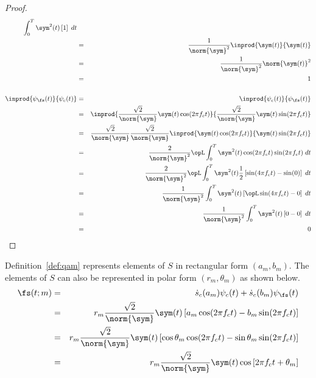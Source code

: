 \begin{proof}
\begin{eqnarray*}
          \int_0^T \sym^2(t)\left[ 1 \right] \; dt
    \\&=& \frac{1}{\norm{\sym}^2}
          \inprod{\sym(t)}{\sym(t)}
    \\&=& \frac{1}{\norm{\sym}^2}
          \norm{\sym(t)}^2
    \\&=& 1
\\ \\
   \inprod{\psi_\fs(t)}{\psi_c(t)}
      &=& \inprod{\psi_c(t)}{\psi_\fs(t)}
    \\&=& \inprod{\frac{\sqrt{2}}{\norm{\sym}} \sym(t) \cos(2\pi f_c t)}
                 {\frac{\sqrt{2}}{\norm{\sym}} \sym(t) \sin(2\pi f_c t)}
    \\&=& \frac{\sqrt{2}}{\norm{\sym}}\frac{\sqrt{2}}{\norm{\sym}}
          \inprod{ \sym(t) \cos(2\pi f_c t)}
                 { \sym(t) \sin(2\pi f_c t)}
    \\&=& \frac{2}{\norm{\sym}^2}
          \opL
          \int_0^T \sym^2(t) \cos(2\pi f_c t)\sin(2\pi f_c t) \; dt
    \\&=& \frac{2}{\norm{\sym}^2}
          \opL
          \int_0^T \sym^2(t)\frac{1}{2}
          \left[\sin(4\pi f_c t)-\sin(0)\right] \; dt
    \\&=& \frac{1}{\norm{\sym}^2}
          \int_0^T \sym^2(t)
          \left[\opL\sin(4\pi f_c t)-0\right] \; dt
    \\&=& \frac{1}{\norm{\sym}^2}
          \int_0^T \sym^2(t)
          \left[0-0\right] \; dt
    \\&=& 0
\end{eqnarray*}
\end{proof}


Definition~\ref{def:qam} represents elements of $S$ in rectangular form
$(a_m,b_m)$.
The elements of $S$ can also be represented in polar form
$(r_m,\theta_m)$ as shown below.
\begin{eqnarray*}
   \fs(t;m) 
     &=& \dot{s}_c(a_m) \psi_c(t) + \dot{s}_c(b_m) \psi_\fs(t)
   \\&=& r_m \frac{\sqrt{2}}{\norm{\sym}} \sym(t) 
         \left[
            a_m \cos(2\pi f_c t) -b_m \sin(2\pi f_c t)
         \right]
   \\&=& r_m \frac{\sqrt{2}}{\norm{\sym}} \sym(t) 
         \left[
            \cos\theta_m \cos(2\pi f_c t) -\sin\theta_m \sin(2\pi f_c t)
         \right]
   \\&=& r_m \frac{\sqrt{2}}{\norm{\sym}} \sym(t)  
         \cos\left[ 2\pi f_c t + \theta_m \right]
\end{eqnarray*}



